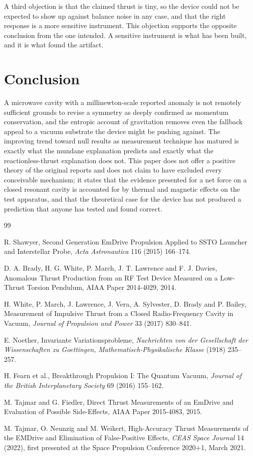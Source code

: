 \documentclass[11pt]{article}
\begin{document}
A third objection is that the claimed thrust is tiny, so the device could not be expected to show up against balance noise in any case, and that the right response is a more sensitive instrument. This objection supports the opposite conclusion from the one intended. A sensitive instrument is what has been built, and it is what found the artifact.

\section{Conclusion}

A microwave cavity with a millinewton-scale reported anomaly is not remotely sufficient grounds to revise a symmetry as deeply confirmed as momentum conservation, and the entropic account of gravitation removes even the fallback appeal to a vacuum substrate the device might be pushing against. The improving trend toward null results as measurement technique has matured is exactly what the mundane explanation predicts and exactly what the reactionless-thrust explanation does not. This paper does not offer a positive theory of the original reports and does not claim to have excluded every conceivable mechanism; it states that the evidence presented for a net force on a closed resonant cavity is accounted for by thermal and magnetic effects on the test apparatus, and that the theoretical case for the device has not produced a prediction that anyone has tested and found correct.

\begin{thebibliography}{99}

 R. Shawyer, Second Generation EmDrive Propulsion Applied to SSTO Launcher and Interstellar Probe, \emph{Acta Astronautica} 116 (2015) 166--174.

 D. A. Brady, H. G. White, P. March, J. T. Lawrence and F. J. Davies, Anomalous Thrust Production from an RF Test Device Measured on a Low-Thrust Torsion Pendulum, AIAA Paper 2014-4029, 2014.

 H. White, P. March, J. Lawrence, J. Vera, A. Sylvester, D. Brady and P. Bailey, Measurement of Impulsive Thrust from a Closed Radio-Frequency Cavity in Vacuum, \emph{Journal of Propulsion and Power} 33 (2017) 830--841.

 E. Noether, Invariante Variationsprobleme, \emph{Nachrichten von der Gesellschaft der Wissenschaften zu Goettingen, Mathematisch-Physikalische Klasse} (1918) 235--257.

 H. Fearn et al., Breakthrough Propulsion I: The Quantum Vacuum, \emph{Journal of the British Interplanetary Society} 69 (2016) 155--162.

 M. Tajmar and G. Fiedler, Direct Thrust Measurements of an EmDrive and Evaluation of Possible Side-Effects, AIAA Paper 2015-4083, 2015.

 M. Tajmar, O. Neunzig and M. Weikert, High-Accuracy Thrust Measurements of the EMDrive and Elimination of False-Positive Effects, \emph{CEAS Space Journal} 14 (2022), first presented at the Space Propulsion Conference 2020+1, March 2021.

\end{thebibliography}
\end{document}
